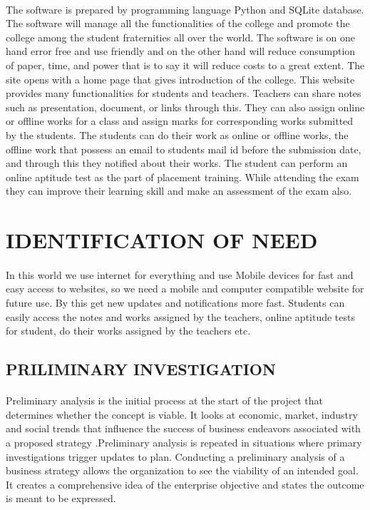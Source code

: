 \documentclass[a4paper, 12pt]{report}
\begin{document}
\paragraph{}The software is prepared by programming language Python and SQLite database. The software will manage all the functionalities of the college and promote the college among the student fraternities all over the world. The software is on one hand error free and use friendly and on the other hand will reduce consumption of paper, time, and power that is to say it will reduce costs to a great extent. The site opens with a home page that gives introduction of the college. This website provides many functionalities for students and teachers. Teachers can share notes such as presentation, document, or links through this. They can also assign online or offline works for a class and assign marks for corresponding works submitted by the students. The students can do their work as online or offline works, the offline work that possess an email to students mail id before the submission date, and through this they notified about their works. The student can perform an online aptitude test as the part of placement training. While attending the exam they can improve their learning skill and make an assessment of the exam also. 
\section{IDENTIFICATION OF NEED}
\paragraph{}
In this world we use internet for everything and use Mobile devices for fast and easy access to websites, so we need  a mobile and computer compatible website for future use. By this get new updates and notifications more fast. Students can easily access the notes and works assigned by the teachers, online aptitude tests for student, do their works assigned by the teachers etc.  
\subsection{PRILIMINARY INVESTIGATION}
\paragraph{}
Preliminary analysis is the initial process at the start of the project that determines whether the concept is viable. It looks at economic, market, industry and social trends that influence the success of business endeavors associated with a proposed strategy .Preliminary analysis is repeated in situations where primary investigations trigger updates to plan. Conducting a preliminary analysis of a business strategy allows the organization to see the viability of an intended goal. It creates a comprehensive idea of the enterprise objective and states the outcome is meant to be expressed.
\end{document}
